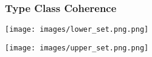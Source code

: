 \documentclass{beamer}
\newcommand\Singleton[1]{\mathbb{1}_#1}
\begin{document}
\begin{frame}
  \frametitle{Type Class Coherence}



  \texttt{[image: images/lower\_set.png.png]}


  \texttt{[image: images/upper\_set.png.png]}

  \end{frame}

\end{document}
